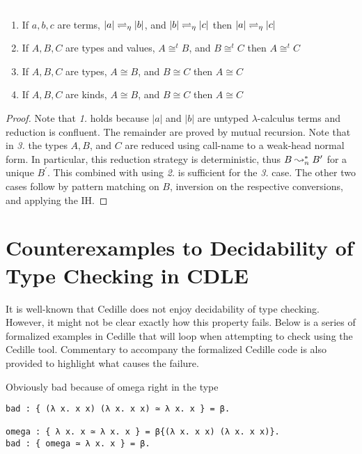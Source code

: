 \begin{lemma}
    \label{lem:4:c1_trans}
    \textcolor{white}{\_}
    \begin{enumerate}
        \item If $a, b, c$ are terms, $|a| \rightleftharpoons_\eta |b|$, and $|b| \rightleftharpoons_\eta |c|$ then $|a| \rightleftharpoons_\eta |c|$
        \item If $A, B, C$ are types and values, $A \cong^t B$, and $B \cong^t C$ then $A \cong^t C$
        \item If $A, B, C$ are types, $A \cong B$, and $B \cong C$ then $A \cong C$
        \item If $A, B, C$ are kinds, $A \cong B$, and $B \cong C$ then $A \cong C$
    \end{enumerate}
\end{lemma}
\begin{proof}
    Note that \textit{1.} holds because $|a|$ and $|b|$ are untyped $\lambda$-calculus terms and reduction is confluent.
    The remainder are proved by mutual recursion.
    Note that in \textit{3.} the types $A, B$, and $C$ are reduced using call-name to a weak-head normal form.
    In particular, this reduction strategy is deterministic, thus $B \leadsto^*_n B^\prime$ for a unique $B^\prime$.
    This combined with using \textit{2.} is sufficient for the \textit{3.} case.
    The other two cases follow by pattern matching on $B$, inversion on the respective conversions, and applying the IH.
\end{proof}

\section{Counterexamples to Decidability of Type Checking in CDLE}

It is well-known that Cedille does not enjoy decidability of type checking.
However, it might not be clear exactly how this property fails.
Below is a series of formalized examples in Cedille that will loop when attempting to check using the Cedille tool.
Commentary to accompany the formalized Cedille code is also provided to highlight what causes the failure.

Obviously bad because of omega right in the type
\begin{verbatim}
bad : { (λ x. x x) (λ x. x x) ≃ λ x. x } = β.

omega : { λ x. x ≃ λ x. x } = β{(λ x. x x) (λ x. x x)}.
bad : { omega ≃ λ x. x } = β.
\end{verbatim}

